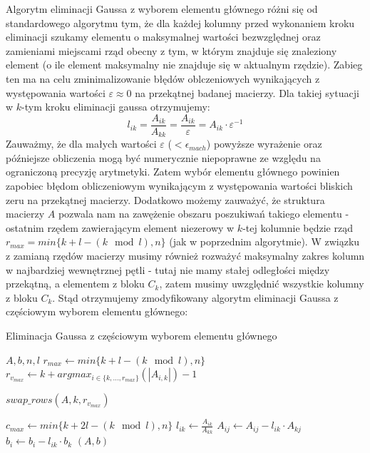 \documentclass[11pt]{article}
\begin{document}
        \noindent
        Algorytm eliminacji Gaussa z wyborem elementu głównego różni się od standardowego algorytmu tym, że dla każdej kolumny przed wykonaniem kroku eliminacji szukamy elementu o maksymalnej wartości bezwzględnej oraz zamieniami miejscami rząd obecny z tym, w którym znajduje się znaleziony element (o ile element maksymalny nie znajduje się w aktualnym rzędzie).
        \newline
        Zabieg ten ma na celu zminimalizowanie błędów oblczeniowych wynikających z występowania wartości $\varepsilon \approx 0$ na przekątnej badanej macierzy. Dla takiej sytuacji w $k$-tym kroku eliminacji gaussa otrzymujemy:
        $$ l_{ik} = \frac{A_{ik}}{A_{kk}} = \frac{A_{ik}}{\varepsilon} = A_{ik} \cdot \varepsilon^{-1} $$
        \noindent
        \newline
        Zauważmy, że dla małych wartości $\varepsilon$ ($< \epsilon_{mach}$) powyższe wyrażenie oraz późniejsze obliczenia mogą być numerycznie niepoprawne ze względu na ograniczoną precyzję arytmetyki.
        \newline\newline
        Zatem wybór elementu głównego powinien zapobiec błędom obliczeniowym wynikającym z występowania wartości bliskich zeru na przekątnej macierzy.
        \newline
        Dodatkowo możemy zauważyć, że struktura macierzy $A$ pozwala nam na zawężenie obszaru poszukiwań takiego elementu - ostatnim rzędem zawierającym element niezerowy w $k$-tej kolumnie będzie rząd $r_{max} =  min\{k + l - (k \mod l), n\}$ (jak w poprzednim algorytmie). W związku z zamianą rzędów macierzy musimy również rozważyć maksymalny zakres kolumn w najbardziej wewnętrznej pętli - tutaj nie mamy stałej odległości między przekątną, a elementem z bloku $C_k$, zatem musimy uwzględnić wszystkie kolumny z bloku $C_k$. Stąd otrzymujemy zmodyfikowany algorytm eliminacji Gaussa z częściowym wyborem elementu głównego:

        \begin{algorithm}[h!]
        \caption{Eliminacja Gaussa z częściowym wyborem elementu głównego}
        \label{alg:gauss_elimination_partial_pivot}
        \begin{algorithmic}[1]
            \Require $A, b, n, l$
                \State $r_{max} \gets min\{k + l - (k \mod l), n\}$
                \State $r_{v_{max}} \gets k + argmax_{i \in \{k, ..., r_{max}\}}(|A_{i, k}|) - 1$

                    \State $swap\_rows(A, k, r_{v_{max}})$
                \EndIf

                \State $c_{max} \gets min\{k + 2l - (k \mod l), n\}$
                    \State $l_{ik} \gets \frac{A_{ik}}{A_{kk}}$
                        \State $A_{ij} \gets A_{ij} - l_{ik} \cdot A_{kj}$
                    \EndFor
                    \State $b_i \gets b_i - l_{ik} \cdot b_k$
                \EndFor
            \EndFor
            \State \Return $(A, b)$
        \end{algorithmic}
        \end{algorithm}
\end{document}
